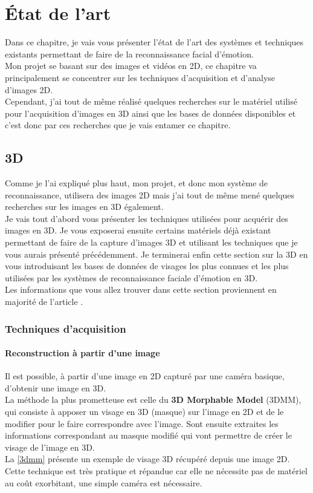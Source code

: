 \documentclass[poster]{polytech/polytech}
\begin{document}
\chapter{État de l'art}
\label{chap:chap_sota}

Dans ce chapitre, je vais vous présenter l'état de l'art des systèmes et techniques existants permettant de faire de la reconnaissance facial d'émotion.\\
Mon projet se basant sur des images et vidéos en 2D, ce chapitre va principalement se concentrer sur les techniques d'acquisition et d'analyse d'images 2D.\\
Cependant, j'ai tout de même réalisé quelques recherches sur le matériel utilisé pour l'acquisition d'images en 3D ainsi que les bases de données disponibles et c'est donc par ces recherches que je vais entamer ce chapitre.

\newpage
\section{3D}
\label{sec:3d}

Comme je l'ai expliqué plus haut, mon projet, et donc mon système de reconnaissance, utilisera des images 2D mais j'ai tout de même mené quelques recherches sur les images en 3D également.\\
Je vais tout d'abord vous présenter les techniques utilisées pour acquérir des images en 3D. Je vous exposerai ensuite certains matériels déjà existant permettant de faire de la capture d'images 3D et utilisant les techniques que je vous aurais présenté précédemment. Je terminerai enfin cette section sur la 3D en vous introduisant les bases de données de visages les plus connues et les plus utilisées par les systèmes de reconnaissance faciale d'émotion en 3D.\\
Les informations que vous allez trouver dans cette section proviennent en majorité de l'article \cite{sota3d}.

\subsection{Techniques d'acquisition}
\label{subsec:tech}

\subsubsection{Reconstruction à partir d'une image}
\label{single_img_reconstruct}
Il est possible, à partir d'une image en 2D capturé par une caméra basique, d'obtenir une image en 3D.\\
La méthode la plus prometteuse est celle du \textbf{3D Morphable Model} (3DMM), qui consiste à apposer un visage en 3D (masque) sur l'image en 2D et de le modifier pour le faire correspondre avec l'image. Sont ensuite extraites les informations correspondant au masque modifié qui vont permettre de créer le visage de l'image en 3D.\\
La \autoref{3dmm} présente un exemple de visage 3D récupéré depuis une image 2D.\\
Cette technique est très pratique et répandue car elle ne nécessite pas de matériel au coût exorbitant, une simple caméra est nécessaire.
\end{document}
